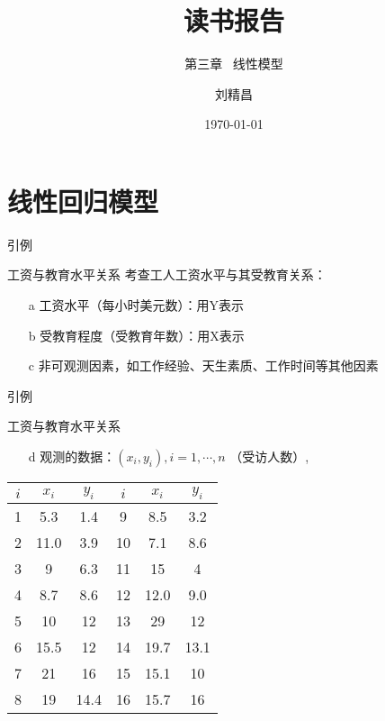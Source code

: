 \documentclass[xetex,mathserif,serif]{beamer}
\begin{document}
\title[机器学习读书会报告] %
{读书报告}
\subtitle{第三章 \ 线性模型}
\author{刘精昌 } %
\date{\today}
\subject{读书会}

\begin{frame}
\titlepage
\end{frame}

\section{线性回归模型}

\begin{frame}{引例}
  \begin{block}{工资与教育水平关系}
    考查工人工资水平与其受教育关系：
    \begin{itemize}
      \item[a] 工资水平（每小时美元数）：用Y表示
      \item[b] 受教育程度（受教育年数）：用X表示
      \item[c] 非可观测因素，如工作经验、天生素质、工作时间等其他因素
    \end{itemize}
  \end{block}
\end{frame}

\begin{frame}{引例}
    \begin{block}{工资与教育水平关系}
    \begin{itemize}
      \item[d] 观测的数据：$\left(x_i,y_i\right),i=1,\cdots,n$ （受访人数）,
    \end{itemize}
    \end{block}
    \begin{tabular}{c||c c|c||c c}
      \hline
      $i$ & $x_i$ & $y_i$ & $i$ & $x_i$ & $y_i$ \\
      \hline
      1 & 5.3 & 1.4 & 9 & 8.5 & 3.2 \\
      2 & 11.0 & 3.9 & 10 & 7.1 & 8.6 \\
      3 & 9 & 6.3 & 11 & 15 & 4 \\
      4 & 8.7 & 8.6 & 12 & 12.0 & 9.0 \\
      5 & 10 & 12 & 13 & 29 & 12 \\
      6 & 15.5 & 12 & 14 & 19.7 & 13.1 \\
      7 & 21 & 16 & 15 & 15.1 & 10 \\
      8 & 19 & 14.4 & 16 & 15.7 & 16 \\
      \hline
    \end{tabular}
\end{frame}
\end{document}
